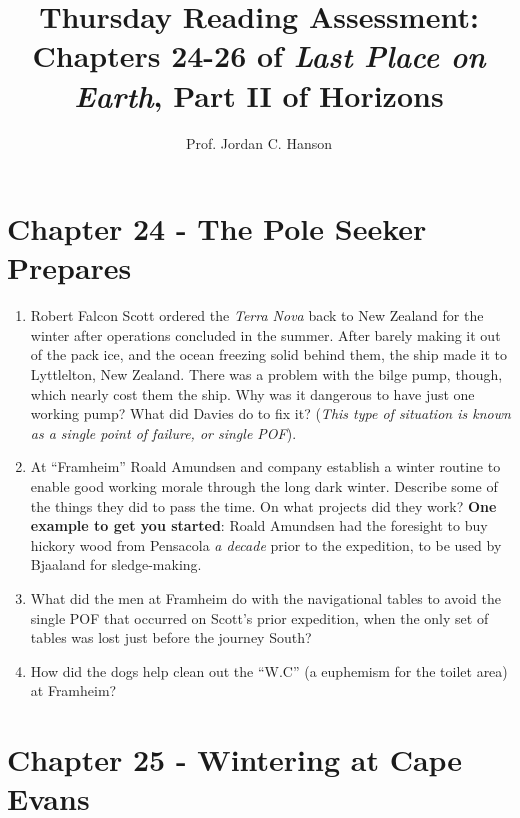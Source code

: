 \documentclass{article}
\begin{document}
\title{Thursday Reading Assessment: Chapters 24-26 of \textit{Last Place on Earth}, Part II of Horizons}
\author{Prof. Jordan C. Hanson}

\maketitle

\section{Chapter 24 - The Pole Seeker Prepares}

\begin{enumerate}
\item Robert Falcon Scott ordered the \textit{Terra Nova} back to New Zealand for the winter after operations concluded in the summer.  After barely making it out of the pack ice, and the ocean freezing solid behind them, the ship made it to Lyttlelton, New Zealand.  There was a problem with the bilge pump, though, which nearly cost them the ship.  Why was it dangerous to have just one working pump?  What did Davies do to fix it?  (\textit{This type of situation is known as a single point of failure, or single POF}). \\ \vspace{2cm}
\item At ``Framheim'' Roald Amundsen and company establish a winter routine to enable good working morale through the long dark winter.  Describe some of the things they did to pass the time.  On what projects did they work?  \textbf{One example to get you started}: Roald Amundsen had the foresight to buy hickory wood from Pensacola \textit{a decade} prior to the expedition, to be used by Bjaaland for sledge-making.\\ \vspace{2cm}
\item What did the men at Framheim do with the navigational tables to avoid the single POF that occurred on Scott's prior expedition, when the only set of tables was lost just before the journey South? \\ \vspace{1cm}
\item How did the dogs help clean out the ``W.C'' (a euphemism for the toilet area) at Framheim? \\ \vspace{1cm}
\end{enumerate}

\section{Chapter 25 - Wintering at Cape Evans}
\end{document}
